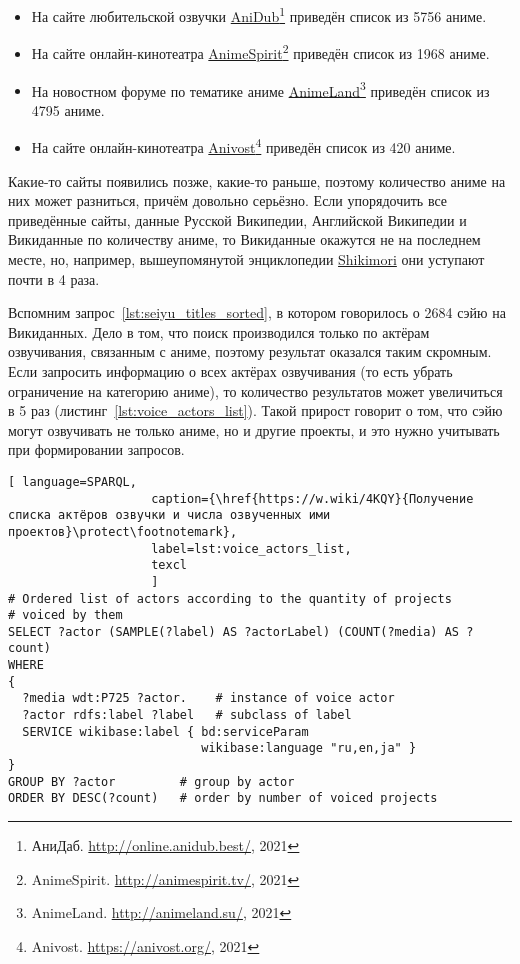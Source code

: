 \begin{itemize}
	\item На сайте любительской озвучки \href{http://online.anidub.best/}{AniDub}\footnote{АниДаб. \href{http://online.anidub.best/}{http://online.anidub.best/}, 2021} приведён список из \num{5756} аниме.
	\item На сайте онлайн-кинотеатра \href{http://animespirit.tv/}{AnimeSpirit}\footnote{AnimeSpirit. \href{http://animespirit.tv/}{http://animespirit.tv/}, 2021} приведён список из \num{1968} аниме.
	\item На новостном форуме по тематике аниме \href{http://animeland.su/}{AnimeLand}\footnote{AnimeLand. \href{http://animeland.su/}{http://animeland.su/}, 2021} приведён список из \num{4795} аниме.
	\item На сайте онлайн-кинотеатра \href{https://anivost.org/}{Anivost}\footnote{Anivost. \href{https://anivost.org/}{https://anivost.org/}, 2021} приведён список из \num{420} аниме.
\end{itemize}

Какие-то сайты появились позже, какие-то раньше, поэтому количество аниме на них может разниться, причём довольно серьёзно. Если упорядочить все приведённые сайты, данные Русской Википедии, Английской Википедии и Викиданные по количеству аниме, то Викиданные окажутся не на последнем месте, но, например, вышеупомянутой энциклопедии \href{https://shikimori.one/}{Shikimori} они уступают почти в 4 раза.

Вспомним запрос~\protect\ref{lst:seiyu_titles_sorted}, в котором говорилось о \num{2684} сэйю на Викиданных. Дело в том, что поиск производился только по актёрам озвучивания, связанным с аниме, поэтому результат оказался таким скромным. Если запросить информацию о всех актёрах озвучивания (то есть убрать ограничение на категорию аниме), то количество результатов может увеличиться в \num{5} раз (листинг~\protect\ref{lst:voice_actors_list}). Такой прирост говорит о том, что сэйю могут озвучивать не только аниме, но и другие проекты, и это нужно учитывать при формировании запросов.

\begin{lstlisting}[ language=SPARQL, 
                    caption={\href{https://w.wiki/4KQY}{Получение списка актёров озвучки и числа озвученных ими проектов}\protect\footnotemark},
                    label=lst:voice_actors_list,
                    texcl 
                    ]
# Ordered list of actors according to the quantity of projects
# voiced by them
SELECT ?actor (SAMPLE(?label) AS ?actorLabel) (COUNT(?media) AS ?count)
WHERE
{
  ?media wdt:P725 ?actor.	 # instance of voice actor
  ?actor rdfs:label ?label	 # subclass of label
  SERVICE wikibase:label { bd:serviceParam
                           wikibase:language "ru,en,ja" }
}
GROUP BY ?actor		    # group by actor
ORDER BY DESC(?count)	# order by number of voiced projects 
\end{lstlisting}%

